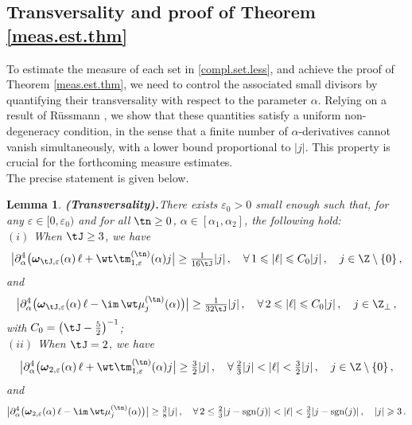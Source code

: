 \documentclass[a4paper,reqno,10pt]{article}
\newtheorem{lem}{Lemma}[section]
\newcommand{\pa}{\partial}
\newcommand{\bomega}{{\boldsymbol{\omega}}}
\begin{document}
\subsection{Transversality and proof of Theorem \ref{meas.est.thm}}
To estimate the measure of each set in \eqref{compl.set.less}, and achieve the proof of Theorem \ref{meas.est.thm}, we need to control the associated small divisors by quantifying their transversality with respect to the parameter $\alpha$. 
Relying on a result of R\"ussmann \cite{Russ}, we show that these quantities satisfy a uniform non-degeneracy condition, in the sense that a finite number of $\alpha$-derivatives cannot vanish simultaneously, with a lower bound proportional to $|j|$. This property is crucial for the forthcoming measure estimates.
\\
The precise statement is given below.
%
\begin{lem}{\bf (Transversality).}\label{transversality.lemma}
	There exists $\varepsilon_0>0$ small enough such that, for any  $\varepsilon\in[0,\varepsilon_{0})$  and for all $\tn\geq 0$, $\alpha\in [\alpha_{1},\alpha_{2}]$,  the following hold:
    \\[1mm]
    \noindent $(i)$ When $\tJ\geq 3$, we have
		\begin{align}
             \big| \pa_{\alpha}^4 \big( \bomega_{\tJ,\varepsilon}(\alpha)\,\ell + \wt\tm_{1,\varepsilon}^{(\tn)}(\alpha) j  \big| \geq \tfrac{1}{16\tJ}  |j|
			\,, \quad  \forall\, 1\leqslant |\ell|\leqslant C_0 |j|\,, \quad j \in \Z\setminus\{0\}\,, 
            \end{align}
            and
            \begin{align}
            \big| \pa_{\alpha}^4 \big( \bomega_{\tJ,\varepsilon}(\alpha)\,\ell -\im\,\wt\mu_{j}^{(\tn)}(\alpha) \big)  \big| \geq \tfrac{1}{32\tJ}   |j|
			\,, \quad\forall\,2\leqslant |\ell|\leqslant C_0 |j|\,,\quad  j\in \Z_{\perp} \,, 
		\end{align}
        with $C_0= \big( \tJ -\tfrac52 \big)^{-1}$;
        \\[1mm]
        \noindent $(ii)$ When $\tJ=2$, we have
        \begin{align}
			   \big| \pa_{\alpha}^4 \big( \bomega_{2,\varepsilon}(\alpha)\,\ell + \wt\tm_{1,\varepsilon}^{(\tn)}(\alpha) j  \big| \geq \tfrac32  |j|
			\,, \quad   \forall\, \tfrac23|j|< |\ell|< \tfrac32 |j|\,, \quad j \in \Z \setminus \{0\} \,,  
            \end{align}
            and
            \begin{align}
			  \big| \pa_{\alpha}^4 \big( \bomega_{2,\varepsilon}(\alpha)\,\ell -\im\,\wt\mu_{j}^{(\tn)}(\alpha) \big)  \big| \geq  \tfrac38  |j|
			\,, \quad  \forall \,2 \leq \tfrac23|j-{\rm{sgn}}(j)|< |\ell|< \tfrac32 |j-{\rm sgn}(j)|\,,\quad |j|\geqslant3 \,. 
		\end{align}
\end{lem}
\end{document}
